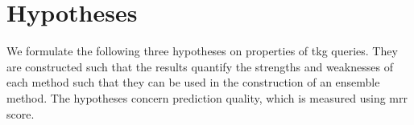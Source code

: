 \section{Hypotheses}
\label{sec:hypotheses}

We formulate the following three hypotheses on properties of \gls{tkg} queries.
They are constructed such that the results quantify the strengths and weaknesses of each method such that they can be used in the construction of an ensemble method.
The hypotheses concern prediction quality, which is measured using \gls{mrr} score.



